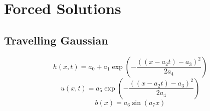 \section{Forced Solutions}





\subsection{Travelling Gaussian}
\begin{equation}
h(x,t) = a_0 + a_1\exp\left(-\dfrac{ \left(\left(x - a_2t\right) - a_3 \right)^2}{2a_4}\right)
\end{equation}
\begin{equation}
u(x,t) = a_5\exp\left(-\dfrac{ \left(\left(x - a_2t\right) - a_3 \right)^2}{2a_4}\right)
\end{equation}
\begin{equation}
b(x) = a_6\sin\left(a_7 x\right)
\end{equation}










